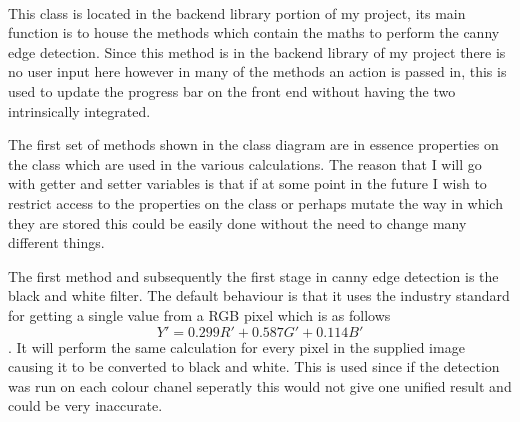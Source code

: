 \begin{FlushLeft}
    \begin{figure}[H]
        \centering
    \end{figure}\\

    This class is located in the backend library portion of my project, its main function is to house the methods which contain the maths to perform the canny edge detection. Since this method is in the backend library of my project there is no user input here however in many of the methods an action is passed in, this is used to update the progress bar on the front end without having the two intrinsically integrated. \\ \bk

    The first set of methods shown in the class diagram are in essence properties on the class which are used in the various calculations. The reason that I will go with getter and setter variables is that if at some point in the future I wish to restrict access to the properties on the class or perhaps mutate the way in which they are stored this could be easily done without the need to change many different things. \\ \bk

    The first method and subsequently the first stage in canny edge detection is the black and white filter. The default behaviour is that it uses the industry standard for getting a single value from a RGB pixel which is as follows $$ Y' = 0.299R' + 0.587G' + 0.114B' $$.  It will perform the same calculation for every pixel in the supplied image causing it to be converted to black and white. This is used since if the detection was run on each colour chanel seperatly this would not give one unified result and could be very inaccurate.\\ 


\end{FlushLeft}
